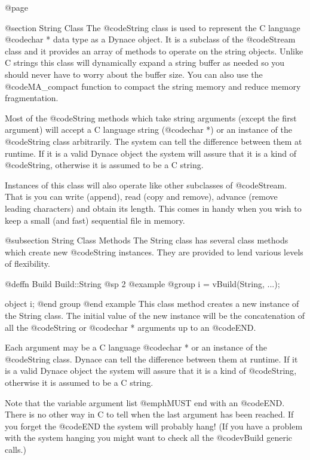 @page

@section String Class
The @code{String} class is used to represent the C language
@code{char *} data type as a Dynace object.  It is a subclass
of the @code{Stream} class and it provides an array of methods
to operate on the string objects.  Unlike C strings this class will
dynamically expand a string buffer as needed so you should never have to
worry about the buffer size.  You can also use the @code{MA_compact}
function to compact the string memory and reduce memory fragmentation.

Most of the @code{String} methods which take string arguments (except
the first argument) will accept a C language string (@code{char *}) or
an instance of the @code{String} class arbitrarily.  The system can tell
the difference between them at runtime.  If it is a valid Dynace object 
the system will assure that it is a kind of @code{String}, otherwise
it is assumed to be a C string.

Instances of this class will also operate like other subclasses of
@code{Stream}.  That is you can write (append), read (copy and remove),
advance (remove leading characters) and obtain its length.  This
comes in handy when you wish to keep a small (and fast) sequential
file in memory.


@subsection String Class Methods
The String class has several class methods which create new @code{String}
instances.  They are provided to lend various levels of flexibility.







@deffn {Build} Build::String
@sp 2
@example
@group
i = vBuild(String, ...);

object  i;
@end group
@end example
This class method creates a new instance of the String class.
The initial value of the new instance will be the concatenation
of all the @code{String} or @code{char *} arguments up to an @code{END}.

Each argument may be a C language @code{char *} or an instance of the
@code{String} class.  Dynace can tell the difference between them at
runtime.  If it is a valid Dynace object the system will assure that it is
a kind of @code{String}, otherwise it is assumed to be a C string.

Note that the variable argument list @emph{MUST} end with an @code{END}.
There is no other way in C to tell when the last argument has been reached.
If you forget the @code{END} the system will probably hang!  (If you
have a problem with the system hanging you might want to check all the
@code{vBuild} generic calls.)

